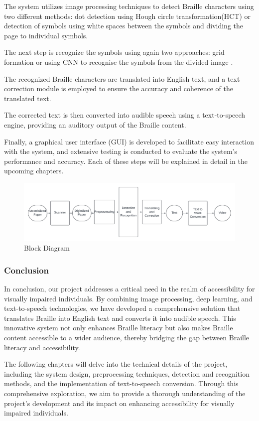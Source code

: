 The system utilizes image processing techniques to detect Braille characters using two different methods: dot detection using Hough circle transformation(HCT) or detection of symbols using white spaces between the symbols and dividing the page to individual symbols. 

The next step is recognize the symbols using again two approaches: grid formation or using CNN to recognise the symbols from the divided image .

The recognized Braille characters are translated into English text, and a text correction module is employed to ensure the accuracy and coherence of the translated text. 

The corrected text is then converted into audible speech using a text-to-speech engine, providing an auditory output of the Braille content.

Finally, a graphical user interface (GUI) is developed to facilitate easy interaction with the system, and extensive testing is conducted to evaluate the system's performance and accuracy. Each of these steps will be explained in detail in the upcoming chapters.

\begin{figure}[!ht]
\centering
\includegraphics[width=1\linewidth]{Block diagram.png}
\caption{Block Diagram}
\label{fig:Block Diagram}
\end{figure} 

\subsubsection{Conclusion}

In conclusion, our project addresses a critical need in the realm of accessibility for visually impaired individuals. By combining image processing, deep learning, and text-to-speech technologies, we have developed a comprehensive solution that translates Braille into English text and converts it into audible speech. This innovative system not only enhances Braille literacy but also makes Braille content accessible to a wider audience, thereby bridging the gap between Braille literacy and accessibility.

The following chapters will delve into the technical details of the project, including the system design, preprocessing techniques, detection and recognition methods, and the implementation of text-to-speech conversion. Through this comprehensive exploration, we aim to provide a thorough understanding of the project's development and its impact on enhancing accessibility for visually impaired individuals.
